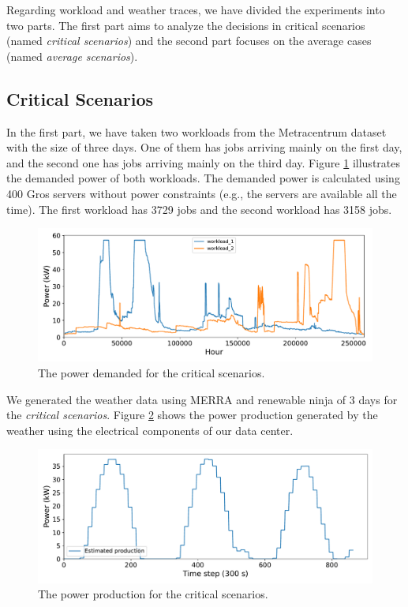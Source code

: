 Regarding workload and weather traces, we have divided the experiments into two parts. The first part aims to analyze the decisions in critical scenarios (named \emph{critical scenarios}) and the second part focuses on the average cases (named \emph{average scenarios}). 

\subsection{Critical Scenarios}

In the first part, we have taken two workloads from the Metracentrum dataset with the size of three days. One of them has jobs arriving mainly on the first day, and the second one has jobs arriving mainly on the third day. Figure \ref{fig:critical_workload} illustrates the demanded power of both workloads. The demanded power is calculated using 400 Gros servers without power constraints (e.g., the servers are available all the time). The first workload has 3729 jobs and the second workload has 3158 jobs. 

\begin{figure}[!htb]
    \centering
    \includegraphics[scale=0.58]{Images/Compensations/critical_jobs_arriving.pdf}
    \caption{The power demanded for the critical scenarios.}
    \label{fig:critical_workload}
\end{figure}

We generated the weather data using MERRA and renewable ninja of 3 days for the \emph{critical scenarios}. Figure \ref{fig:critical_weather} shows the power production generated by the weather using the electrical components of our data center. 

\begin{figure}[!htb]
    \centering
    \includegraphics[scale=0.58]{Images/Compensations/critical_power_production.pdf}
    \caption{The power production for the critical scenarios.}
    \label{fig:critical_weather}
\end{figure}

